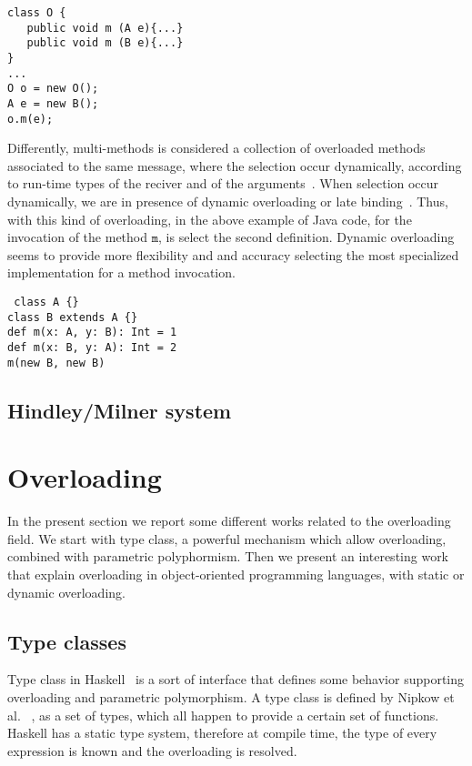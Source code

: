\documentclass[hidelinks, twocolumn]{article}
\begin{document}
\texttt{class O \{\\
\ \ \ public void m (A e)\{...\}\\
\ \ \ public void m (B e)\{...\}\\
\}\\
...\\
O o = new O();\\
A e = new B();\\
o.m(e);}       


Differently, multi-methods is considered a collection of overloaded methods associated to the same message, where the selection occur dynamically, according to run-time types of the reciver and of the arguments~\cite{FJM}. When selection occur dynamically, we are in presence of dynamic overloading or late binding~\cite{castagna1997337}. Thus, with this kind of overloading, in the above example of Java code, for the invocation of the method $\texttt{m}$, is select the second definition. Dynamic overloading seems to provide more flexibility and and accuracy selecting the most specialized implementation for a method invocation.

\texttt{
class A \{\} \\
class B extends A \{\} \\
def m(x: A, y: B): Int = 1\\
def m(x: B, y: A): Int = 2\\
m(new B, new B)\\ }

\subsection{Hindley/Milner system}

\section{Overloading}\label{section:polymorphism}
In the present section we report some different works related to the overloading field. We start with type class, a powerful mechanism which allow overloading, combined with parametric polyphormism. Then we present an interesting work that explain overloading in object-oriented programming languages, with static or dynamic overloading.
\subsection{Type classes}
Type class in Haskell~\cite{wadlerBlott:popl89} is a sort of interface that defines some behavior supporting overloading and parametric polymorphism. A type class is defined by Nipkow et al.~\cite{Nipkow1993}	, as a set of types, which all happen to provide a certain set of functions. Haskell has a static type system, therefore at compile time, the type of every expression is known and the overloading  is resolved. 
\end{document}
